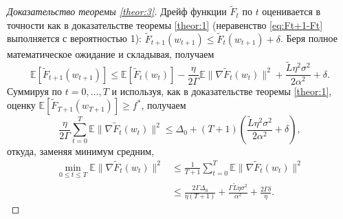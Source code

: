 \begin{proof}[Доказательство теоремы \ref{theor:3}]
Дрейф функции $\widetilde{F}_t$ по $t$ оценивается в точности как в доказательстве теоремы \ref{theor:1} (неравенство \eqref{eq:Ft+1-Ft} выполняется с вероятностью 1): $\widetilde{F}_{t+1}(w_{t+1}) \le \widetilde{F}_t(w_{t+1}) + \delta$. Беря полное математическое ожидание и складывая, получаем
\begin{equation*}
    \mathbb{E}\left[\widetilde{F}_{t+1}(w_{t+1})\right] \le \mathbb{E}\left[\widetilde{F}_t(w_t)\right] - \frac{\eta}{2\Gamma} \mathbb{E}\|\nabla \widetilde{F}_t(w_t)\|^2 + \frac{\widetilde{L}\eta^2\sigma^2}{2\alpha^2} + \delta.
\end{equation*}
Суммируя по $t = 0, \ldots, T$ и используя, как в доказательстве теоремы \ref{theor:1}, оценку $\mathbb{E}[\widetilde{F}_{T+1}(w_{T+1})] \ge f^*$, получаем
\begin{equation*}
    \frac{\eta}{2\Gamma} \sum_{t=0}^{T} \mathbb{E}\|\nabla \widetilde{F}_t(w_t)\|^2 \le \Delta_0 + (T+1)\left(\frac{\widetilde{L}\eta^2\sigma^2}{2\alpha^2} + \delta\right),
\end{equation*}
откуда, заменяя минимум средним,
\begin{equation*}
\begin{split}
    \min_{0 \le t \le T} \mathbb{E}\|\nabla \widetilde{F}_t(w_t)\|^2 &\le \frac{1}{T+1}\sum_{t=0}^{T} \mathbb{E}\|\nabla \widetilde{F}_t(w_t)\|^2 \\
    &\le \frac{2\Gamma\Delta_0}{\eta(T+1)} + \frac{\Gamma\widetilde{L}\eta\sigma^2}{\alpha^2} + \frac{2\Gamma\delta}{\eta}.
\end{split}
\end{equation*}
\end{proof}

